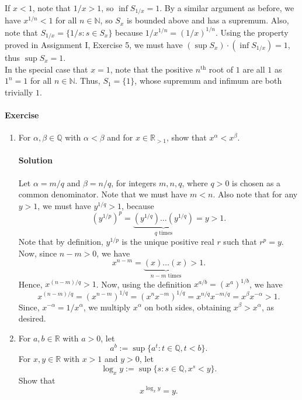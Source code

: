 \documentclass[10pt]{article}
\newcounter{prob}
\def\problem{\stepcounter{prob}\paragraph{Exercise \arabic{prob}}}
\def\solution{\paragraph{Solution}}
\begin{document}
        If $x < 1$, note that $1 /x > 1$, so $\inf{S_{1 /x}} = 1$. By a similar argument as before, we have $x^{1 /n} < 1$ for all $n \in \mathbb{N}$,
        so $S_x$ is bounded above and has a supremum. Also, note that $S_{1 /x} = \{1 /s: s \in S_x\}$ because $1 /x^{1 /n} = (1 /x)^{1 /n}$.
        Using the property proved in Assignment I, Exercise 5, we must have $(\sup S_x)\cdot(\inf S_{1 /x}) = 1$, thus
        $\sup{S_x} = 1$. \\

        In the special case that $x = 1$, note that the positive $n^\text{th}$ root of $1$ are all $1$ as $1^n = 1$ for all $n \in \mathbb{N}$.
        Thus, $S_1 = \{1\}$, whose supremum and infimum are both trivially $1$.

        \problem
        \begin{enumerate}
                \item For $\alpha, \beta \in \mathbb{Q}$ with $\alpha < \beta$ and for $x \in \mathbb{R}_{>1}$, show that $x^\alpha < x^\beta$.
                \solution Let $\alpha = m / q$ and $\beta = n / q$, for integers $m, n, q$, where $q > 0$ is chosen as a common denominator.
                Note that we must have $m < n$. Also note that for any $y > 1$, we must have $y^{1 /q} > 1$, because
                \[
                        (y^{1 /p})^p = \underbrace{(y^{1 /q})\dots(y^{1 /q})}_{q\text{ times}} = y > 1.
                \]
                Note that by definition, $y^{1 /p}$ is the unique positive real $r$ such that $r^p = y$. Now, since $n - m > 0$, we have
                \[
                        x^{n - m} = \underbrace{(x)\dots(x)}_{n-m\text{ times}} > 1.
                \]
                Hence, $x^{(n - m) /q} > 1$. Now, using the definition $x^{a /b} = (x^a)^{1 /b}$, we have
                \[
                        x^{(n - m) /q} = (x^{n - m})^{1 /q} = (x^{n} x^{-m})^{1 /q} = x^{n /q} x^{-m /q} = x^\beta x^{-\alpha} > 1.
                \]
                Since, $x^{-\alpha} = 1 /x^{\alpha}$, we multiply $x^\alpha$ on both sides, obtaining $x^\beta > x^{\alpha}$, as desired.
                

                \item For $a, b \in \mathbb{R}$ with $a > 0$, let 
                \[
                        a^b := \sup\{a^t: t \in \mathbb{Q}, t < b\}.
                \]
                For $x, y \in \mathbb{R}$ with $x > 1$ and $y > 0$, let 
                \[
                        \log_{x}{y} := \sup\{s: s\in \mathbb{Q}, x^s < y\}.
                \]
                Show that
                \[
                        x^{\log_x{y}} = y.
                \]


\end{enumerate}
\end{document}
